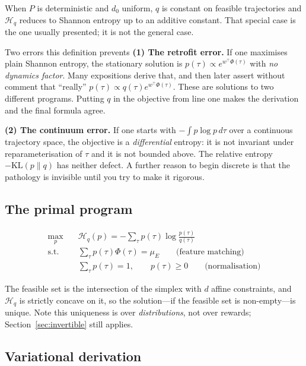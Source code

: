 \documentclass[11pt]{article}
\theoremstyle{plain}
\theoremstyle{definition}
\theoremstyle{remark}
\newcommand{\KL}{\mathrm{KL}}
\begin{document}
When $P$ is deterministic and $d_0$ uniform, $q$ is constant on feasible
trajectories and $\mathcal{H}_q$ reduces to Shannon entropy up to an
additive constant. That special case is the one usually presented; it is
not the general case.

\begin{redbox}{Two errors this definition prevents}
\textbf{(1) The retrofit error.} If one maximises plain Shannon entropy,
the stationary solution is $p(\tau)\propto e^{w^\top\Phi(\tau)}$ with
\emph{no dynamics factor}. Many expositions derive that, and then later
assert without comment that ``really'' $p(\tau)\propto
q(\tau)e^{w^\top\Phi(\tau)}$. These are solutions to two different
programs. Putting $q$ in the objective from line one makes the derivation
and the final formula agree.

\textbf{(2) The continuum error.} If one starts with $-\int p\log p\,d\tau$
over a continuous trajectory space, the objective is a \emph{differential}
entropy: it is not invariant under reparameterisation of $\tau$ and it is
not bounded above. The relative entropy $-\KL(p\|q)$ has neither defect. A
further reason to begin discrete is that the pathology is invisible until
you try to make it rigorous.
\end{redbox}

\subsection{The primal program}

\begin{equation}
\begin{aligned}
\max_p \quad & \mathcal{H}_q(p) = -\sum_\tau p(\tau)\log\frac{p(\tau)}{q(\tau)}\\
\text{s.t.} \quad & \sum_\tau p(\tau)\Phi(\tau) = \mu_E \qquad \text{(feature matching)}\\
& \sum_\tau p(\tau) = 1, \qquad p(\tau) \ge 0 \qquad \text{(normalisation)}
\end{aligned}
\label{eq:maxentprimal}
\end{equation}

The feasible set is the intersection of the simplex with $d$ affine
constraints, and $\mathcal{H}_q$ is strictly concave on it, so the
solution---if the feasible set is non-empty---is unique. Note this
uniqueness is over \emph{distributions}, not over rewards; Section~\ref{sec:invertible}
still applies.

\subsection{Variational derivation}
\end{document}
